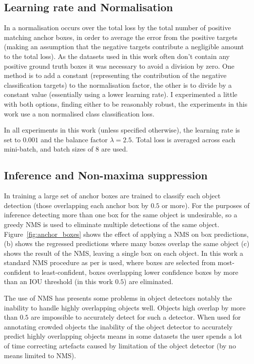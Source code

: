 \subsection {Learning rate and Normalisation}

In \cite{Lin2017} a normalisation occurs over the total loss by the total number of positive matching anchor boxes, in order to average the error from the positive targets (making an assumption that the negative targets contribute a negligible amount to the total loss). As the datasets used in this work often don't contain any positive ground truth boxes it was necessary to avoid a division by zero. One method is to add a constant (representing the contribution of the negative classification targets) to the normalisation factor, the other is to divide by a constant value (essentially using a lower learning rate). I experimented a little with both options, finding either to be reasonably robust, the experiments in this work use a non normalised class classification loss.

In all experiments in this work (unless specified otherwise), the learning rate is set to $0.001$ and the balance factor $\lambda=2.5$. Total loss is averaged across each mini-batch, and batch sizes of $8$ are used.

\subsection{Inference and Non-maxima suppression}

In training a large set of anchor boxes are trained to classify each object detection (those overlapping each anchor box by $0.5$ or more). For the purposes of inference detecting more than one box for the same object is undesirable, so a greedy \gls{NMS} is used to eliminate multiple detections of the same object. Figure~\ref{fig:anchor_boxes} shows the effect of applying a \gls{NMS} on box predictions, (b) shows the regressed predictions where many boxes overlap the same object (c) shows the result of the \gls{NMS}, leaving a single box on each object. In this work a standard \gls{NMS} procedure as per \cite{Wang2017} is used, where boxes are selected from most-confident to least-confident, boxes overlapping lower confidence boxes by more than an \gls{IOU} threshold (in this work $0.5$) are eliminated.

The use of \gls{NMS} has presents some problems in object detectors notably the inability to handle highly overlapping objects well. Objects high overlap by more than $0.5$ are impossible to accurately detect for such a detector. When used for annotating crowded objects the inability of the object detector to accurately predict highly overlapping objects means in some datasets the user spends a lot of time correcting artefacts caused by limitation of the object detector (by no means limited to \gls{NMS}).


